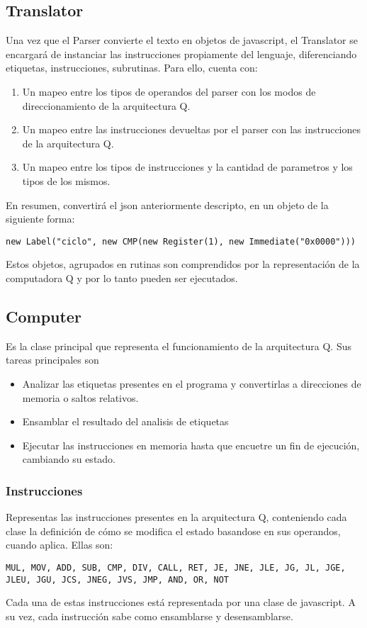 \documentclass{article}
\begin{document}
\subsection*{Translator}
Una vez que el Parser convierte el texto en objetos de javascript, el Translator se encargará de instanciar las instrucciones propiamente del lenguaje, diferenciando etiquetas, instrucciones, subrutinas. Para ello, cuenta con:
\begin{enumerate}
	\item Un mapeo entre los tipos de operandos del parser con los modos de direccionamiento de la arquitectura Q.
	\item Un mapeo entre las instrucciones devueltas por el parser con las instrucciones de la arquitectura Q.
	\item Un mapeo entre los tipos de instrucciones y la cantidad de parametros y los tipos de los mismos.
\end{enumerate}
En resumen, convertirá el json anteriormente descripto, en un objeto de la siguiente forma:
\begin{center}
\texttt{new Label("ciclo", new CMP(new Register(1), new Immediate("0x0000")))}
\end{center}
Estos objetos, agrupados en rutinas son comprendidos por la representación de la computadora Q y por lo tanto pueden ser ejecutados.

\subsection*{Computer}
Es la clase principal que representa el funcionamiento de la arquitectura Q. Sus tareas principales son
\begin{itemize}
	\item Analizar las etiquetas presentes en el programa y convertirlas a direcciones de memoria o saltos relativos.
	\item Ensamblar el resultado del analisis de etiquetas
	\item Ejecutar las instrucciones en memoria hasta que encuetre un fin de ejecución, cambiando su estado.
\end{itemize}

\subsubsection*{Instrucciones}
Representas las instrucciones presentes en la arquitectura Q, conteniendo cada clase la definición de cómo se modifica el estado basandose en sus operandos, cuando aplica.
Ellas son:   
\begin{center}
\texttt{MUL, MOV, ADD, SUB, CMP, DIV, CALL, RET, JE, JNE, JLE, JG, JL, JGE, JLEU, JGU, JCS, JNEG, JVS, JMP, AND, OR, NOT}
\end{center}
Cada una de estas instrucciones está representada por una clase de javascript. A su vez, cada instrucción sabe como ensamblarse y desensamblarse.
\end{document}
